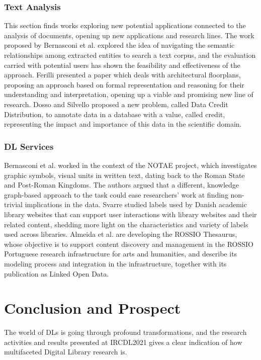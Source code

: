 \documentclass{sig-alternate-10pt}
\begin{document}
\subsubsection*{Text Analysis}
This section finds works exploring new potential applications connected to the analysis of documents, opening up new applications and research lines. 
The work proposed by Bernasconi et al. \cite{BernasconiCM21} explored the idea of navigating the semantic relationships among extracted entities to search a text corpus, and the evaluation carried with potential users has shown the feasibility and effectiveness of the approach.
Ferilli \cite{Ferilli21} presented a paper which deals with architectural floorplans, proposing an approach based on formal representation and reasoning for their understanding and interpretation, opening up a viable and promising new line of research.  
Dosso and Silvello \cite{DossoS21} proposed a new problem, called Data Credit Distribution, to annotate data in a database with a value, called credit, representing the impact and importance of this data in the scientific domain. 


\subsubsection*{DL Services}
Bernasconi et al. \cite{BernasconiBCCGL21} worked in the context of the NOTAE project, which investigates graphic symbols, visual units in written text, dating back to the Roman State and Post-Roman Kingdoms. The authors argued that a different, knowledge graph-based approach to the task could ease researchers' work at finding non-trivial implications in the data. 
Svarre \cite{Svarre21} studied labels used by Danish academic library websites that can support user interactions with library websites and their related content, shedding more light on the characteristics and variety of labels used across libraries. 
Almeida et al. \cite{AlmeidaFM21} are developing the ROSSIO Thesaurus, whose objective is to support content discovery and management in the ROSSIO Portuguese research infrastructure for arts and humanities, and describe its modeling process and integration in the infrastructure, together with its publication as Linked Open Data.


\section{Conclusion and Prospect}
The world of DLs is going through profound transformations,
and the research activities and results presented at
IRCDL2021 gives a clear indication of how multifaceted Digital Library research is.
\end{document}
